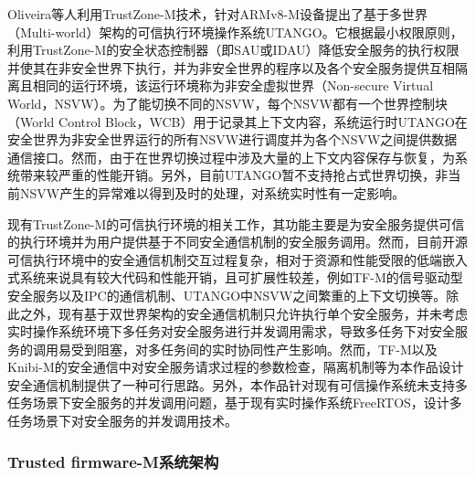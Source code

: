 \documentclass[UTF8,12pt,a4paper]{ctexart}
\numberwithin{figure}{section}
\begin{document}
\par Oliveira\cite{uTango}等人利用TrustZone-M技术，针对ARMv8-M设备提出了基于多世界（Multi-world）架构的可信执行环境操作系统UTANGO。它根据最小权限原则，利用TrustZone-M的安全状态控制器（即SAU或IDAU）降低安全服务的执行权限并使其在非安全世界下执行，并为非安全世界的程序以及各个安全服务提供互相隔离且相同的运行环境，该运行环境称为非安全虚拟世界（Non-secure Virtual World，NSVW）。为了能切换不同的NSVW，每个NSVW都有一个世界控制块（World Control Block，WCB）用于记录其上下文内容，系统运行时UTANGO在安全世界为非安全世界运行的所有NSVW进行调度并为各个NSVW之间提供数据通信接口。然而，由于在世界切换过程中涉及大量的上下文内容保存与恢复，为系统带来较严重的性能开销。另外，目前UTANGO暂不支持抢占式世界切换，非当前NSVW产生的异常难以得到及时的处理，对系统实时性有一定影响。
\par 现有TrustZone-M的可信执行环境的相关工作，其功能主要是为安全服务提供可信的执行环境并为用户提供基于不同安全通信机制的安全服务调用。然而，目前开源可信执行环境中的安全通信机制交互过程复杂，相对于资源和性能受限的低端嵌入式系统来说具有较大代码和性能开销，且可扩展性较差，例如TF-M的信号驱动型安全服务以及IPC的通信机制、UTANGO中NSVW之间繁重的上下文切换等。除此之外，现有基于双世界架构的安全通信机制只允许执行单个安全服务，并未考虑实时操作系统环境下多任务对安全服务进行并发调用需求，导致多任务下对安全服务的调用易受到阻塞，对多任务间的实时协同性产生影响。然而，TF-M以及Knibi-M的安全通信中对安全服务请求过程的参数检查，隔离机制等为本作品设计安全通信机制提供了一种可行思路。另外，本作品针对现有可信操作系统未支持多任务场景下安全服务的并发调用问题，基于现有实时操作系统FreeRTOS，设计多任务场景下对安全服务的并发调用技术。


\subsubsection{Trusted firmware-M系统架构}
\end{document}
